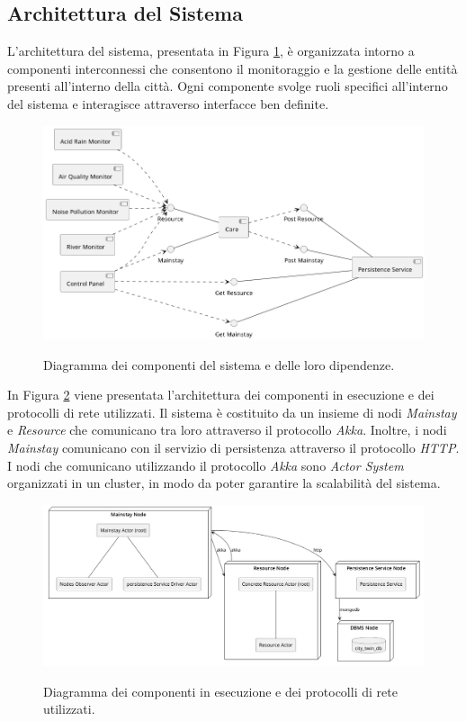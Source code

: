 \documentclass{scrartcl}
\begin{document}
\subsection{Architettura del Sistema}

L'architettura del sistema, presentata in Figura \ref{fig:core-component-diagram}, è organizzata intorno a componenti interconnessi che consentono il monitoraggio e la gestione delle entità presenti all'interno della città. Ogni componente svolge ruoli specifici all'interno del sistema e interagisce attraverso interfacce ben definite.

\begin{figure}[H]
    \caption{Diagramma dei componenti del sistema e delle loro dipendenze.}
    \includegraphics[width=\textwidth]{../assets/images/core-component-diagram.png}
    \label{fig:core-component-diagram}
\end{figure}

In Figura \ref{fig:nodes-component-diagram} viene presentata l'architettura dei componenti in esecuzione e dei protocolli di rete utilizzati. Il sistema è costituito da un insieme di nodi \textit{Mainstay} e \textit{Resource} che comunicano tra loro attraverso il protocollo \textit{Akka}. Inoltre, i nodi \textit{Mainstay} comunicano con il servizio di persistenza attraverso il protocollo \textit{HTTP}.
I nodi che comunicano utilizzando il protocollo \textit{Akka} sono \textit{Actor System} organizzati in un cluster, in modo da poter garantire la scalabilità del sistema.

\begin{figure}[H]
    \caption{Diagramma dei componenti in esecuzione e dei protocolli di rete utilizzati.}
    \includegraphics[width=\textwidth]{../assets/images/nodes-component-diagram.png}
    \label{fig:nodes-component-diagram}
\end{figure}
\end{document}

